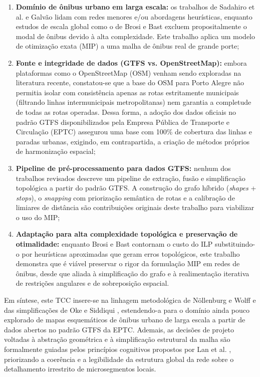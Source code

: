\documentclass[cic,tc]{infufrgs}
\begin{document}
\begin{enumerate}
    \item \textbf{Domínio de ônibus urbano em larga escala:} os trabalhos de Sadahiro et al. e Galvão lidam com redes menores e/ou abordagens heurísticas, enquanto estudos de escala global como o de Brosi e Bast \cite{brosi2023large} excluem propositalmente o modal de ônibus devido à alta complexidade. Este trabalho aplica um modelo de otimização exata (MIP) a uma malha de ônibus real de grande porte;

    \item \textbf{Fonte e integridade de dados (GTFS vs. OpenStreetMap):} embora plataformas como o OpenStreetMap (OSM) venham sendo exploradas na literatura recente, constatou-se que a base do OSM para Porto Alegre não permitia isolar com consistência apenas as rotas estritamente municipais (filtrando linhas intermunicipais metropolitanas) nem garantia a completude de todas as rotas operadas. Dessa forma, a adoção dos dados oficiais no padrão GTFS disponibilizados pela Empresa Pública de Transporte e Circulação (EPTC) assegurou uma base com 100\% de cobertura das linhas e paradas urbanas, exigindo, em contrapartida, a criação de métodos próprios de harmonização espacial;

    \item \textbf{Pipeline de pré-processamento para dados GTFS:} nenhum dos trabalhos revisados descreve um pipeline de extração, fusão e simplificação topológica a partir do padrão GTFS. A construção do grafo híbrido (\textit{shapes} + \textit{stops}), o \textit{snapping} com priorização semântica de rotas e a calibração de limiares de distância são contribuições originais deste trabalho para viabilizar o uso do MIP;

    \item \textbf{Adaptação para alta complexidade topológica e preservação de otimalidade:} enquanto Brosi e Bast contornam o custo do ILP substituindo-o por heurísticas aproximadas que geram erros topológicos, este trabalho demonstra que é viável preservar o rigor da formulação MIP em redes de ônibus, desde que aliada à simplificação do grafo e à realimentação iterativa de restrições angulares e de sobreposição espacial.
\end{enumerate}

Em síntese, este TCC insere-se na linhagem metodológica de Nöllenburg e Wolff \cite{Nollenburg} e das simplificações de Oke e Siddiqui \cite{Oke}, estendendo-a para o domínio ainda pouco explorado de mapas esquemáticos de ônibus urbano de larga escala a partir de dados abertos no padrão GTFS da EPTC. Ademais, as decisões de projeto voltadas à abstração geométrica e à simplificação estrutural da malha são formalmente guiadas pelos princípios cognitivos propostos por Lan et al. \cite{TianLan}, priorizando a coerência e a legibilidade da estrutura global da rede sobre o detalhamento irrestrito de microsegmentos locais.
\end{document}
